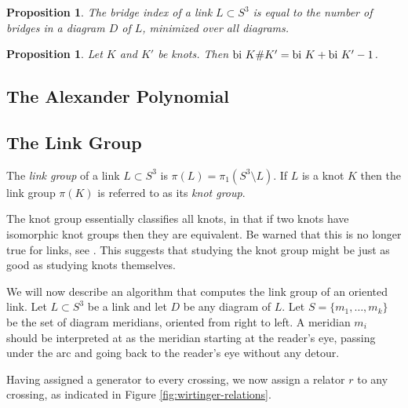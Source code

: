 \documentclass{article}
\newtheorem{proposition}[theorem]{Proposition}
\theoremstyle{definition}
\begin{document}
\begin{proposition}
The bridge index of a link $L \subset S^3$ is equal to the number of bridges in a diagram $D$ of $L$, minimized over all diagrams.
\end{proposition}


\begin{proposition}\label{prop:bridge-index-connected-sum}
Let $K$ and $K'$ be knots. Then $\textup{bi } K\#K' = \textup{bi } K + \textup{bi }K' - 1$.
\end{proposition}

\subsection{The Alexander Polynomial}
\subsection{The Link Group}\label{subsec:link-group}
The \textit{link group} of a link $L \subset S^3$ is $\pi(L) = \pi_1(S^3 \setminus L)$. If $L$ is a knot $K$ then the link group $\pi(K)$ is referred to as its \textit{knot group}.

The knot group essentially classifies all knots, in that if two knots have isomorphic knot groups then they are equivalent. Be warned that this is no longer true for links, see \cite{rolfsen2003}. This suggests that studying the knot group might be just as good as studying knots themselves.

We will now describe an algorithm that computes the link group of an oriented link. Let $L \subset S^3$ be a link and let $D$ be any diagram of $L$. Let $S = \{m_1, \dots, m_k\}$ be the set of diagram meridians, oriented from right to left. A meridian $m_i$ should be interpreted at as the meridian starting at the reader's eye, passing under the arc and going back to the reader's eye without any detour.

Having assigned a generator to every crossing, we now assign a relator $r$ to any crossing, as indicated in Figure \ref{fig:wirtinger-relations}.
\end{document}
